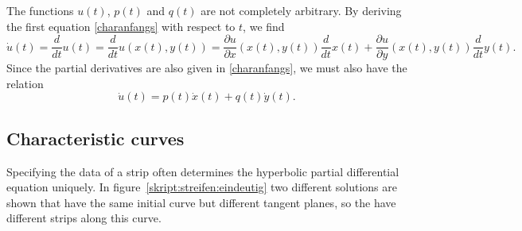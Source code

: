 The functions $u(t)$, $p(t)$ and $q(t)$ are not completely arbitrary.
By deriving the first equation \eqref{charanfangs} with respect to $t$,
we find
\[
\dot{u}(t)=\frac{d}{dt}u(t)
=
\frac{d}{dt}u(x(t),y(t))
=
\frac{\partial u}{\partial x}(x(t), y(t))\frac{d}{dt}x(t)
+
\frac{\partial u}{\partial y}(x(t), y(t))\frac{d}{dt}y(t).
\]
Since the partial derivatives are also given in \eqref{charanfangs},
we must also have the relation
\begin{equation}
\dot{u}(t)= p(t)\dot{x}(t) + q(t)\dot{y}(t).
\label{cauchydatarestriction}
\end{equation}

\subsection{Characteristic curves}
Specifying the data of a strip often determines the hyperbolic
partial differential equation uniquely.
In figure~\ref{skript:streifen:eindeutig} two different solutions
are shown that have the same initial curve but different tangent
planes, so the have different strips along this curve.

